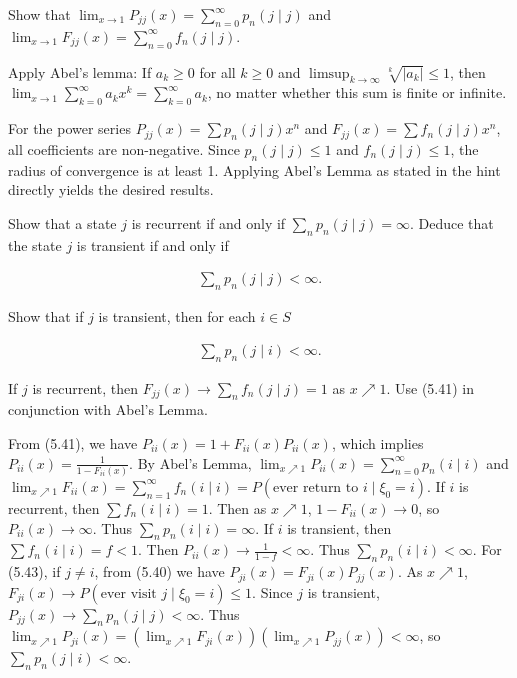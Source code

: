 \begin{Exercise}
\label{exr:abel-lemma}
Show that $\lim_{x\to 1} P_{jj}(x) = \sum_{n=0}^\infty p_n(j \mid j)$ and $\lim_{x\to 1} F_{jj}(x) = \sum_{n=0}^\infty f_n(j \mid j)$.

\begin{hint}
Apply Abel's lemma: If $a_k \geq 0$ for all $k \geq 0$ and $\limsup_{k\to\infty} \sqrt[k]{|a_k|} \leq 1$, then $\lim_{x\to 1} \sum_{k=0}^\infty a_k x^k = \sum_{k=0}^\infty a_k$, no matter whether this sum is finite or infinite.
\end{hint}
\end{Exercise}

\begin{Solution}
For the power series $P_{jj}(x) = \sum p_n(j \mid j) x^n$ and $F_{jj}(x) = \sum f_n(j \mid j) x^n$, all coefficients are non-negative. Since $p_n(j \mid j) \leq 1$ and $f_n(j \mid j) \leq 1$, the radius of convergence is at least 1. Applying Abel's Lemma as stated in the hint directly yields the desired results.
\end{Solution}

\begin{Exercise}
\label{exr:recurrent-sum}
Show that a state $j$ is recurrent if and only if $\sum_n p_n(j \mid j) = \infty$. Deduce that the state $j$ is transient if and only if

\begin{align}
\sum_n p_n(j \mid j) < \infty. \tag{5.42}
\end{align}

Show that if $j$ is transient, then for each $i\in S$

\begin{align}
\sum_n p_n(j \mid i) < \infty. \tag{5.43}
\end{align}

\begin{hint}
If $j$ is recurrent, then $F_{jj}(x) \to \sum_n f_n(j \mid j) = 1$ as $x \nearrow 1$. Use (5.41) in conjunction with Abel's Lemma.
\end{hint}
\end{Exercise}

\begin{Solution}
From (5.41), we have $P_{ii}(x) = 1 + F_{ii}(x) P_{ii}(x)$, which implies $P_{ii}(x) = \frac{1}{1 - F_{ii}(x)}$.
By Abel's Lemma, $\lim_{x \nearrow 1} P_{ii}(x) = \sum_{n=0}^\infty p_n(i \mid i)$ and $\lim_{x \nearrow 1} F_{ii}(x) = \sum_{n=1}^\infty f_n(i \mid i) = P(\text{ever return to } i \mid \xi_0 = i)$.
If $i$ is recurrent, then $\sum f_n(i \mid i) = 1$. Then as $x \nearrow 1$, $1 - F_{ii}(x) \to 0$, so $P_{ii}(x) \to \infty$. Thus $\sum_n p_n(i \mid i) = \infty$.
If $i$ is transient, then $\sum f_n(i \mid i) = f < 1$. Then $P_{ii}(x) \to \frac{1}{1-f} < \infty$. Thus $\sum_n p_n(i \mid i) < \infty$.
For (5.43), if $j \neq i$, from (5.40) we have $P_{ji}(x) = F_{ji}(x) P_{jj}(x)$.
As $x \nearrow 1$, $F_{ji}(x) \to P(\text{ever visit } j \mid \xi_0 = i) \leq 1$.
Since $j$ is transient, $P_{jj}(x) \to \sum_n p_n(j \mid j) < \infty$.
Thus $\lim_{x \nearrow 1} P_{ji}(x) = \left( \lim_{x \nearrow 1} F_{ji}(x) \right) \left( \lim_{x \nearrow 1} P_{jj}(x) \right) < \infty$, so $\sum_n p_n(j \mid i) < \infty$.
\end{Solution}

